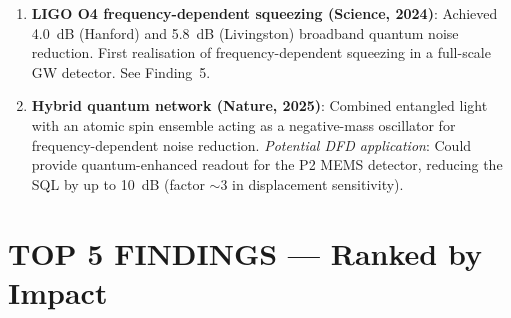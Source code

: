 \documentclass[11pt]{article}
\theoremstyle{definition}
\theoremstyle{remark}
\begin{document}
\begin{enumerate}
\item \textbf{LIGO O4 frequency-dependent squeezing (Science, 2024)}:
  Achieved 4.0~dB (Hanford) and 5.8~dB (Livingston) broadband
  quantum noise reduction. First realisation of frequency-dependent
  squeezing in a full-scale GW detector. See Finding~5.

\item \textbf{Hybrid quantum network (Nature, 2025)}: Combined
  entangled light with an atomic spin ensemble acting as a
  negative-mass oscillator for frequency-dependent noise reduction.
  \emph{Potential DFD application}: Could provide quantum-enhanced
  readout for the P2 MEMS detector, reducing the SQL by up to
  10~dB (factor $\sim 3$ in displacement sensitivity).
\end{enumerate}


\part{TOP 5 FINDINGS --- Ranked by Impact}
\label{part:top5}
\end{document}
